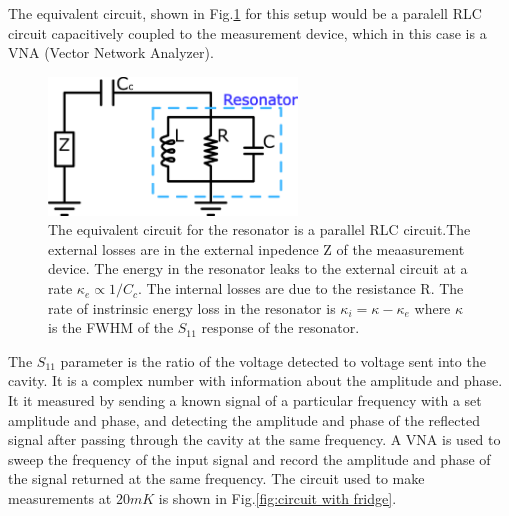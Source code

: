 The equivalent circuit, shown in Fig.\ref{fig:external circuit} for this setup would be a paralell RLC circuit capacitively coupled to the measurement device, which in this case is a VNA (Vector Network Analyzer).

\begin{figure}
\centering
\includegraphics[width=250px]{Figures/external.png}
\decoRule
\caption[External coupling circuit]{The equivalent circuit for the resonator is a parallel RLC circuit.The external losses are in the external inpedence Z of the meaasurement device. The energy in the resonator leaks to the external circuit at a rate $\kappa_e\propto 1/C_c$. The internal losses are due to the resistance R. The rate of instrinsic energy loss in the resonator is $\kappa_i = \kappa - \kappa_e$ where $\kappa$ is the FWHM of the $S_{11}$ response of the resonator.}
\label{fig:external circuit}
\end{figure}

The $S_{11}$ parameter is the ratio of the voltage detected to voltage sent into the cavity. It is a complex number with information about the amplitude and phase. It it measured by sending a known signal of a particular frequency with a set amplitude and phase, and detecting the amplitude and phase of the reflected signal after passing through the cavity at the same frequency. A VNA is used to sweep the frequency of the input signal and record the amplitude and phase of the signal returned at the same frequency. The circuit used to make measurements at $20mK$ is shown in Fig.\ref{fig:circuit with fridge}.


